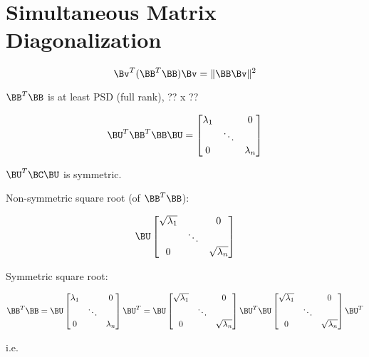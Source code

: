 \section{Simultaneous Matrix Diagonalization}

\begin{equation} \label{eq:A.5}
\Bv^{T}(\BB^{T}\BB)\Bv = \|\BB\Bv\|^{2} 
\end{equation}

$\BB^{T}\BB$ is at least PSD (full rank), ?? x ??

\begin{equation} \label{eq:A.6}
\BU^{T}\BB^{T}\BB\BU = \begin{bmatrix}
\lambda_1 & & 0 \\
 & \ddots & \\
0 & & \lambda_n
\end{bmatrix}
\end{equation}

$\BU^{T}\BC\BU$ is symmetric.

Non-symmetric square root (of $\BB^{T}\BB$):

\begin{equation} \label{eq:A.7}
\BU\begin{bmatrix}
\sqrt{\lambda_1} & & 0 \\
 & \ddots & \\
0 & & \sqrt{\lambda_n}
\end{bmatrix}
\end{equation}

Symmetric square root:

\begin{equation} \label{eq:A.8}
\BB^{T}\BB = \BU\begin{bmatrix}
\lambda_1 & & 0 \\
 & \ddots & \\
0 & & \lambda_n
\end{bmatrix}\BU^{T} = \BU\begin{bmatrix}
\sqrt{\lambda_1} & & 0 \\
 & \ddots & \\
0 & & \sqrt{\lambda_n}
\end{bmatrix}\BU^{T}\BU\begin{bmatrix}
\sqrt{\lambda_1} & & 0 \\
 & \ddots & \\
0 & & \sqrt{\lambda_n}
\end{bmatrix}\BU^{T}
\end{equation}

i.e.

